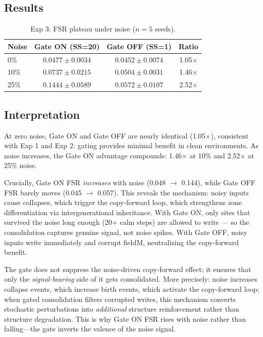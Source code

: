 \documentclass[11pt,twocolumn]{article}
\begin{document}
\subsection{Results}

\begin{table}[h]
\centering
\caption{Exp 3: FSR plateau under noise ($n=5$ seeds).}
\label{tab:exp3}
\begin{tabular}{lccc}
\toprule
Noise & Gate ON (SS=20) & Gate OFF (SS=1) & Ratio \\
\midrule
0\%  & $0.0477 \pm 0.0034$ & $0.0452 \pm 0.0074$ & 1.05$\times$ \\
10\% & $0.0737 \pm 0.0215$ & $0.0504 \pm 0.0031$ & 1.46$\times$ \\
25\% & $0.1444 \pm 0.0589$ & $0.0572 \pm 0.0107$ & 2.52$\times$ \\
\bottomrule
\end{tabular}
\end{table}

\subsection{Interpretation}

At zero noise, Gate ON and Gate OFF are nearly identical (1.05$\times$),
consistent with Exp 1 and Exp 2: gating provides minimal benefit in clean
environments. As noise increases, the Gate ON advantage compounds: 1.46$\times$
at 10\% and 2.52$\times$ at 25\% noise.

Crucially, Gate ON FSR \emph{increases} with noise (0.048 $\to$ 0.144), while
Gate OFF FSR barely moves (0.045 $\to$ 0.057). This reveals the mechanism:
noisy inputs cause collapses, which trigger the copy-forward loop, which
strengthens zone differentiation via intergenerational inheritance. With Gate ON,
only sites that survived the noise long enough (20+ calm steps) are allowed to
write --- so the consolidation captures genuine signal, not noise spikes.
With Gate OFF, noisy inputs write immediately and corrupt fieldM, neutralizing
the copy-forward benefit.

The gate does not suppress the noise-driven copy-forward effect; it ensures that
only the \emph{signal-bearing} side of it gets consolidated.
More precisely: noise increases collapse events, which increase birth events,
which activate the copy-forward loop; when gated consolidation filters corrupted
writes, this mechanism converts stochastic perturbations into \emph{additional}
structure reinforcement rather than structure degradation.
This is why Gate ON FSR rises with noise rather than falling---the gate inverts
the valence of the noise signal.
\end{document}
